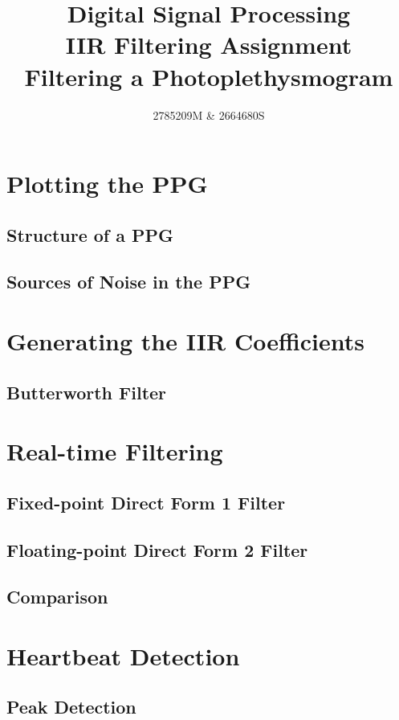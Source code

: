 \documentclass[8pt]{extarticle}
\title{Digital Signal Processing \\ IIR Filtering Assignment \\ Filtering a Photoplethysmogram}
\author{2785209M \& 2664680S}
\date{}
\begin{document}
\twocolumn[\maketitle]


\section{Plotting the PPG}

\subsection{Structure of a PPG}

\subsection{Sources of Noise in the PPG}


\section{Generating the IIR Coefficients}

\subsection{Butterworth Filter}


\section{Real-time Filtering}

\subsection{Fixed-point Direct Form 1 Filter}

\subsection{Floating-point Direct Form 2 Filter}

\subsection{Comparison}


\section{Heartbeat Detection}

\subsection{Peak Detection}
\end{document}
